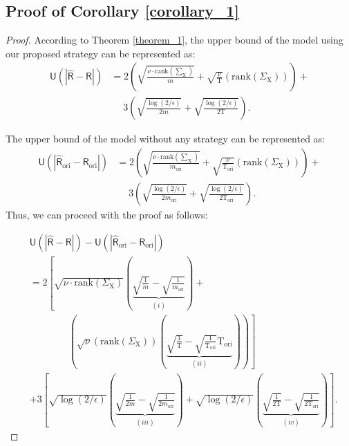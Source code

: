 \subsection{Proof of Corollary \ref{corollary_1}}
\begin{proof}
According to Theorem \ref{theorem_1}, the upper bound of the model using our proposed strategy can be represented as:
\begin{equation}
\begin{aligned}
    \mathsf{U}(|\hat{\mathsf R}-\mathsf R|) &= 2\left(\sqrt{\frac{\nu\cdot\textrm{rank}(\sum_\mathrm{X})}{m}} + \sqrt{\frac{\nu}{\mathrm{T}}}\left(\textrm{rank}(\Sigma_\mathrm{X}) \right) \right) + \\
    & \quad \; 3\left(\sqrt{\frac{\log(2/\epsilon)}{2m}}+\sqrt{\frac{\log(2/\epsilon)}{2\mathrm{T}}}\right).
\end{aligned}
\end{equation}

The upper bound of the model without any strategy can be represented as:
\begin{equation}
\begin{aligned}
\mathsf{U}(|\hat{\mathsf{R}}_\text{ori}-\mathsf R_\text{ori}|) &= 2\left(\sqrt{\frac{\nu\cdot\textrm{rank}(\sum_\mathrm{X})}{m_\text{ori}}} + \sqrt{\frac{\nu}{\mathrm{T}_\text{ori}}}\left(\textrm{rank}(\Sigma_\mathrm{X}) \right) \right) + \\ & \quad \; 3\left(\sqrt{\frac{\log(2/\epsilon)}{2m_\text{ori}}}+\sqrt{\frac{\log(2/\epsilon)}{2\mathrm{T}_\text{ori}}}\right).
\end{aligned}
\end{equation}
Thus, we can proceed with the proof as follows:

\begin{equation}
\begin{aligned}
    &\mathsf{U}(|\hat{\mathsf R}-\mathsf R|)-\mathsf{U}(|\hat{\mathsf{R}}_\text{ori}-\mathsf R_\text{ori}|) \\
    &=2\left[\sqrt{\nu\cdot\textrm{rank}(\Sigma_\mathrm{X})} \left(\underbrace{\sqrt{\frac{1}{m}} - \sqrt{\frac{1}{m_\text{ori}}}}_{(i)}\right) + \right.\\
    & \qquad \qquad \left. \left( \sqrt{\nu}\left(\text{rank}(\Sigma_\mathrm{X})\right) \left( \underbrace{\sqrt{\frac{1}{\mathrm{T}}}-\sqrt{\frac{1}{\mathrm{T}_\text{ori}}}\mathrm{T}_\text{ori}}_{(ii)}\right)\right) \right] \\
    &+3\left[ \sqrt{\log(2/\epsilon)} \left( \underbrace{ \sqrt{\frac{1}{2m}} - \sqrt{\frac{1}{2m_\text{ori}}}}_{(iii)} \right) + \sqrt{\log(2/\epsilon)}\left( \underbrace{ \sqrt{\frac{1}{2\mathrm{T}}} - \sqrt{\frac{1}{2\mathrm{T}_\text{ori}}}}_{(iv)} \right) \right].
\end{aligned}
\end{equation}


\end{proof}
